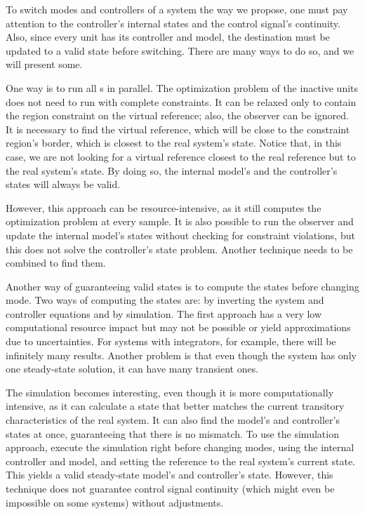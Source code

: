 To switch modes and controllers of a system the way we propose, one must pay
attention to the controller's internal states and the control signal's
continuity. Also, since every \CG{} unit has its controller and model, the
destination \CG{} must be updated to a valid state before switching. There are
many ways to do so, and we will present some.

One way is to run all \CG{}s in parallel. The optimization problem of the
inactive units does not need to run with complete constraints. It can be relaxed
only to contain the region constraint on the virtual reference; also, the
observer can be ignored. It is necessary to find the virtual reference, which
will be close to the constraint region's border, which is closest to the real
system's state. Notice that, in this case, we are not looking for a virtual
reference closest to the real reference but to the real system's state. By doing
so, the internal model's and the controller's states will always be valid.

However, this approach can be resource-intensive, as it still computes the
optimization problem at every sample. It is also possible to run the observer
and update the internal model's states without checking for constraint
violations, but this does not solve the controller's state problem. Another
technique needs to be combined to find them.

Another way of guaranteeing valid states is to compute the states before
changing mode. Two ways of computing the states are: by inverting the system and
controller equations and by simulation. The first approach has a very low
computational resource impact but may not be possible or yield approximations
due to uncertainties. For systems with integrators, for example, there will be
infinitely many results. Another problem is that even though the system has only
one steady-state solution, it can have many transient ones.

The simulation becomes interesting, even though it is more computationally
intensive, as it can calculate a state that better matches the current
transitory characteristics of the real system. It can also find the model's and
controller's states at once, guaranteeing that there is no mismatch. To use the
simulation approach, execute the simulation right before changing modes, using
the internal controller and model, and setting the reference to the real
system's current state. This yields a valid steady-state model's and
controller's state. However, this technique does not guarantee control signal
continuity (which might even be impossible on some systems) without adjustments.

